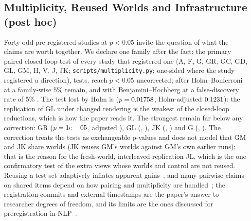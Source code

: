 \subsection{Multiplicity, Reused Worlds and Infrastructure (post hoc)}\label{sec:moved-mult}
Forty-odd pre-registered studies at $p<0.05$ invite the question of what the claims are worth together. We declare one family after the fact: the primary paired closed-loop test of every study that registered one (A, F, G, GR, GC, GD, GL, GM, H, V, J, JK; \texttt{scripts/multiplicity.py}; one-sided where the study registered a direction), \MultM{} tests. \MultRaw{} reach $p<0.05$ uncorrected; after Holm--Bonferroni at a family-wise 5\% \MultHolm{} remain, and with Benjamini--Hochberg at a false-discovery rate of 5\% \MultBH{}. The test lost by Holm is \MultLost{} ($p=0.01758$, Holm-adjusted $0.1231$): the replication of GL under changed rendering is the weakest of the closed-loop reductions, which is how the paper reads it. The strongest remain far below any correction: GR ($p=1e-05$, adjusted \MultGRHolm), GL (\MultGLP, \MultGLHolm), JK (\MultJKP, \MultJKHolm) and G (\MultGP, \MultGHolm). The correction treats the tests as exchangeable p-values and does not model that GM and JK share worlds (JK reuses GM's worlds against GM's own earlier runs); that is the reason for the fresh-world, interleaved replication JL, which is the one confirmatory test of the extra views whose worlds and control are not reused. Reusing a test set adaptively inflates apparent gains~\cite{blum2015ladder}, and many pairwise claims on shared items depend on how pairing and multiplicity are handled~\cite{reyes2026multiplecomparison}; the registration commits and external timestamps are the paper's answer to researcher degrees of freedom, and its limits are the ones discussed for preregistration in NLP~\cite{sogaard2023twosided}.
